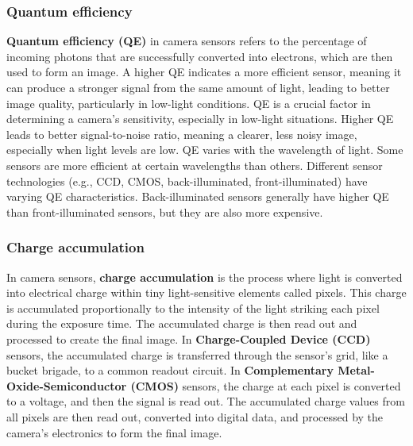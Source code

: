\subsubsection{Quantum efficiency}
\textbf{Quantum efficiency (QE)} in camera sensors refers to the percentage of incoming photons that are successfully converted into electrons, which are then used to form an image. A higher QE indicates a more efficient sensor, meaning it can produce a stronger signal from the same amount of light, leading to better image quality, particularly in low-light conditions. 
\nl
QE is a crucial factor in determining a camera's sensitivity, especially in low-light situations. Higher QE leads to better signal-to-noise ratio, meaning a clearer, less noisy image, especially when light levels are low.
QE varies with the wavelength of light. Some sensors are more efficient at certain wavelengths than others. Different sensor technologies (e.g., CCD, CMOS, back-illuminated, front-illuminated) have varying QE characteristics. Back-illuminated sensors generally have higher QE than front-illuminated sensors, but they are also more expensive. 

\subsubsection{Charge accumulation}
In camera sensors, \textbf{charge accumulation} is the process where light is converted into electrical charge within tiny light-sensitive elements called pixels. This charge is accumulated proportionally to the intensity of the light striking each pixel during the exposure time. The accumulated charge is then read out and processed to create the final image. 
\nl
In \textbf{Charge-Coupled Device (CCD)} sensors, the accumulated charge is transferred through the sensor's grid, like a bucket brigade, to a common readout circuit. 
In \textbf{Complementary Metal-Oxide-Semiconductor (CMOS)} sensors, the charge at each pixel is converted to a voltage, and then the signal is read out. 
The accumulated charge values from all pixels are then read out, converted into digital data, and processed by the camera's electronics to form the final image. 

